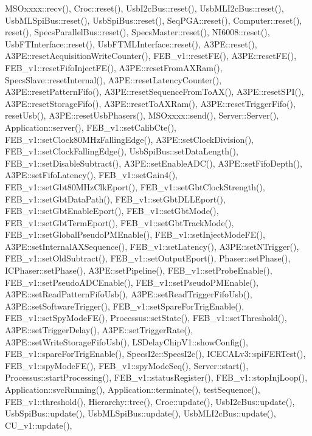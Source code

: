 M\+S\+Oxxxx\+::recv(), Croc\+::reset(), Usb\+I2c\+Bus\+::reset(), Usb\+M\+L\+I2c\+Bus\+::reset(), Usb\+M\+L\+Spi\+Bus\+::reset(), Usb\+Spi\+Bus\+::reset(), Seq\+P\+G\+A\+::reset(), Computer\+::reset(), reset(), Specs\+Parallel\+Bus\+::reset(), Specs\+Master\+::reset(), N\+I6008\+::reset(), Usb\+F\+T\+Interface\+::reset(), Usb\+F\+T\+M\+L\+Interface\+::reset(), A3\+P\+E\+::reset(), A3\+P\+E\+::reset\+Acquisition\+Write\+Counter(), F\+E\+B\+\_\+v1\+::reset\+F\+E(), A3\+P\+E\+::reset\+F\+E(), F\+E\+B\+\_\+v1\+::reset\+Fifo\+Inject\+F\+E(), A3\+P\+E\+::reset\+From\+A\+X\+Ram(), Specs\+Slave\+::reset\+Internal(), A3\+P\+E\+::reset\+Latency\+Counter(), A3\+P\+E\+::reset\+Pattern\+Fifo(), A3\+P\+E\+::reset\+Sequence\+From\+To\+A\+X(), A3\+P\+E\+::reset\+S\+P\+I(), A3\+P\+E\+::reset\+Storage\+Fifo(), A3\+P\+E\+::reset\+To\+A\+X\+Ram(), A3\+P\+E\+::reset\+Trigger\+Fifo(), reset\+Usb(), A3\+P\+E\+::reset\+Usb\+Phasers(), M\+S\+Oxxxx\+::send(), Server\+::\+Server(), Application\+::server(), F\+E\+B\+\_\+v1\+::set\+Calib\+Cte(), F\+E\+B\+\_\+v1\+::set\+Clock80\+M\+Hz\+Falling\+Edge(), A3\+P\+E\+::set\+Clock\+Division(), F\+E\+B\+\_\+v1\+::set\+Clock\+Falling\+Edge(), Usb\+Spi\+Bus\+::set\+Data\+Length(), F\+E\+B\+\_\+v1\+::set\+Disable\+Subtract(), A3\+P\+E\+::set\+Enable\+A\+D\+C(), A3\+P\+E\+::set\+Fifo\+Depth(), A3\+P\+E\+::set\+Fifo\+Latency(), F\+E\+B\+\_\+v1\+::set\+Gain4(), F\+E\+B\+\_\+v1\+::set\+Gbt80\+M\+Hz\+Clk\+Eport(), F\+E\+B\+\_\+v1\+::set\+Gbt\+Clock\+Strength(), F\+E\+B\+\_\+v1\+::set\+Gbt\+Data\+Path(), F\+E\+B\+\_\+v1\+::set\+Gbt\+D\+L\+L\+Eport(), F\+E\+B\+\_\+v1\+::set\+Gbt\+Enable\+Eport(), F\+E\+B\+\_\+v1\+::set\+Gbt\+Mode(), F\+E\+B\+\_\+v1\+::set\+Gbt\+Term\+Eport(), F\+E\+B\+\_\+v1\+::set\+Gbt\+Track\+Mode(), F\+E\+B\+\_\+v1\+::set\+Global\+Pseudo\+P\+M\+Enable(), F\+E\+B\+\_\+v1\+::set\+Inject\+Mode\+F\+E(), A3\+P\+E\+::set\+Internal\+A\+X\+Sequence(), F\+E\+B\+\_\+v1\+::set\+Latency(), A3\+P\+E\+::set\+N\+Trigger(), F\+E\+B\+\_\+v1\+::set\+Old\+Subtract(), F\+E\+B\+\_\+v1\+::set\+Output\+Eport(), Phaser\+::set\+Phase(), I\+C\+Phaser\+::set\+Phase(), A3\+P\+E\+::set\+Pipeline(), F\+E\+B\+\_\+v1\+::set\+Probe\+Enable(), F\+E\+B\+\_\+v1\+::set\+Pseudo\+A\+D\+C\+Enable(), F\+E\+B\+\_\+v1\+::set\+Pseudo\+P\+M\+Enable(), A3\+P\+E\+::set\+Read\+Pattern\+Fifo\+Usb(), A3\+P\+E\+::set\+Read\+Trigger\+Fifo\+Usb(), A3\+P\+E\+::set\+Software\+Trigger(), F\+E\+B\+\_\+v1\+::set\+Spare\+For\+Trig\+Enable(), F\+E\+B\+\_\+v1\+::set\+Spy\+Mode\+F\+E(), Processus\+::set\+State(), F\+E\+B\+\_\+v1\+::set\+Threshold(), A3\+P\+E\+::set\+Trigger\+Delay(), A3\+P\+E\+::set\+Trigger\+Rate(), A3\+P\+E\+::set\+Write\+Storage\+Fifo\+Usb(), L\+S\+Delay\+Chip\+V1\+::show\+Config(), F\+E\+B\+\_\+v1\+::spare\+For\+Trig\+Enable(), Specs\+I2c\+::\+Specs\+I2c(), I\+C\+E\+C\+A\+Lv3\+::spi\+F\+E\+R\+Test(), F\+E\+B\+\_\+v1\+::spy\+Mode\+F\+E(), F\+E\+B\+\_\+v1\+::spy\+Mode\+Seq(), Server\+::start(), Processus\+::start\+Processing(), F\+E\+B\+\_\+v1\+::status\+Register(), F\+E\+B\+\_\+v1\+::stop\+Inj\+Loop(), Application\+::svc\+Running(), Application\+::terminate(), test\+Sequence(), F\+E\+B\+\_\+v1\+::threshold(), Hierarchy\+::tree(), Croc\+::update(), Usb\+I2c\+Bus\+::update(), Usb\+Spi\+Bus\+::update(), Usb\+M\+L\+Spi\+Bus\+::update(), Usb\+M\+L\+I2c\+Bus\+::update(), C\+U\+\_\+v1\+::update(), 
